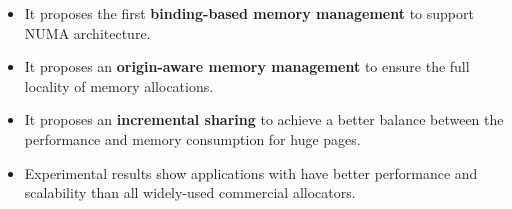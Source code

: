 \begin{itemize}

 \item It proposes the first \textbf{binding-based memory management} to support NUMA architecture.

\item It proposes an \textbf{origin-aware memory management} to ensure the full locality of memory allocations. 

\item It proposes an \textbf{incremental sharing} to achieve a better balance between the performance and memory consumption for huge pages. 



\item Experimental results show applications with \NM{} have better performance and scalability than all widely-used commercial allocators. 




\end{itemize}


